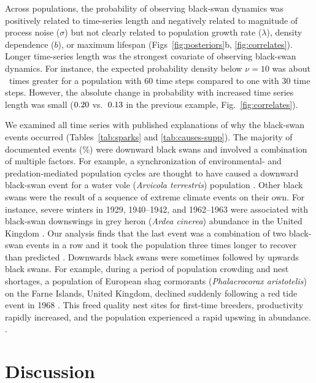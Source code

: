 Across populations, the probability of observing black-swan dynamics was
positively related to time-series length and negatively related to magnitude
of process noise ($\sigma$) but not clearly related to population growth rate
($\lambda$), density dependence ($b$), or maximum lifespan
(Figs~\ref{fig:posteriors}b, \ref{fig:correlates}). Longer time-series length
was the strongest covariate of observing black-swan dynamics. For instance,
the expected probability density below $\nu = 10$ was about \pIncHeavyNThirtyNSixty~times
greater for a population with 60 time steps compared
to one with 30 time steps. However, the absolute change in probability with
increased time series length was small ($0.20$ vs.\ $0.13$
in the previous example, Fig.~\ref{fig:correlates}).

We examined all time series with published explanations of why the black-swan
events occurred (Tables~\ref{tab:sparks} and \ref{tab:causes-supp}). The
majority of documented events (\percBSDown \%) were downward black swans and
involved a combination of multiple factors. For example, a synchronization of
environmental- and predation-mediated population cycles are thought to have
caused a downward black-swan event for a water vole (\textit{Arvicola
  terrestris}) population \citep{saucy1994}. Other black swans were the result
of a sequence of extreme climate events on their own. For instance, severe
winters in 1929, 1940--1942, and 1962--1963 were associated with black-swan
downswings in grey heron (\textit{Ardea cinerea}) abundance in the United
Kingdom \citep{stafford1971}. Our analysis finds that the last event was a
combination of two black-swan events in a row and it took the population three
times longer to recover than predicted \citep{stafford1971}. Downwards black
swans were sometimes followed by upwards black swans. For example, during a
period of population crowding and nest shortages, a population of European
shag cormorants (\textit{Phalacrocorax aristotelis}) on the Farne Islands,
United Kingdom, declined suddenly following a red tide event in 1968
\citep{potts1980}. This freed quality nest sites for first-time breeders,
productivity rapidly increased, and the population experienced a rapid upswing
in abundance. \citep{potts1980}.

\section{Discussion}

